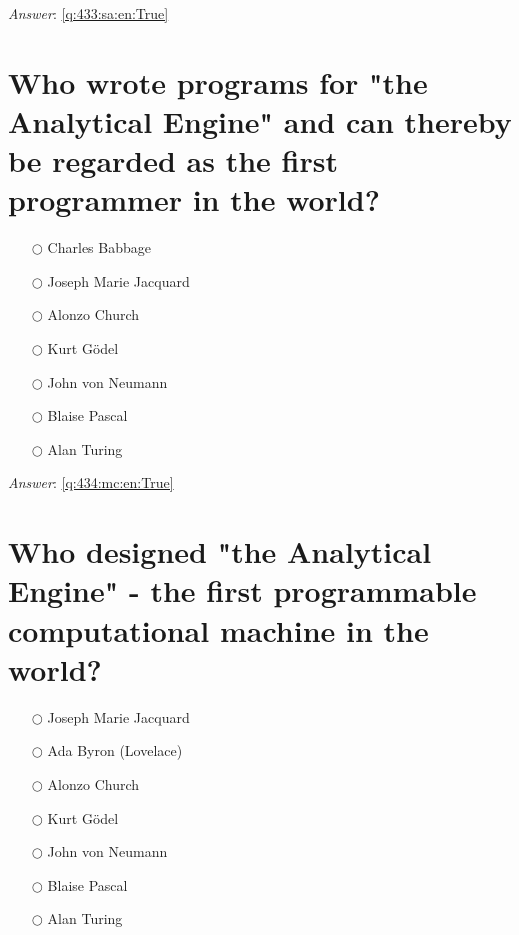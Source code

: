 \documentclass[a4paper,11pt,oneside]{book}
\begin{document}
\begin{sloppypar}
\label{q:433:sa:en:False}

\vspace{2cm}

\noindent\makebox[\textwidth]{\hrulefill}

\vspace{1cm}

\textit{Answer}: \autoref{q:433:sa:en:True}



\section{Who wrote programs for "the Analytical Engine" and can thereby be regarded as the first programmer in the world?}

\label{q:434:mc:en:False}

\begin{itemize}
  \item[$\bigcirc$] Charles Babbage
  \item[$\bigcirc$] Joseph Marie Jacquard
  \item[$\bigcirc$] Alonzo Church
  \item[$\bigcirc$] Kurt G\"odel
  \item[$\bigcirc$] John von Neumann
  \item[$\bigcirc$] Blaise Pascal
  \item[$\bigcirc$] Alan Turing
\end{itemize}

\vspace{1cm}

\textit{Answer}: \autoref{q:434:mc:en:True}



\section{Who designed "the Analytical Engine" - the first programmable computational machine in the world?}

\label{q:435:mc:en:False}

\begin{itemize}
  \item[$\bigcirc$] Joseph Marie Jacquard
  \item[$\bigcirc$] Ada Byron (Lovelace)
  \item[$\bigcirc$] Alonzo Church
  \item[$\bigcirc$] Kurt G\"odel
  \item[$\bigcirc$] John von Neumann
  \item[$\bigcirc$] Blaise Pascal
  \item[$\bigcirc$] Alan Turing
\end{itemize}


\end{sloppypar}
\end{document}
